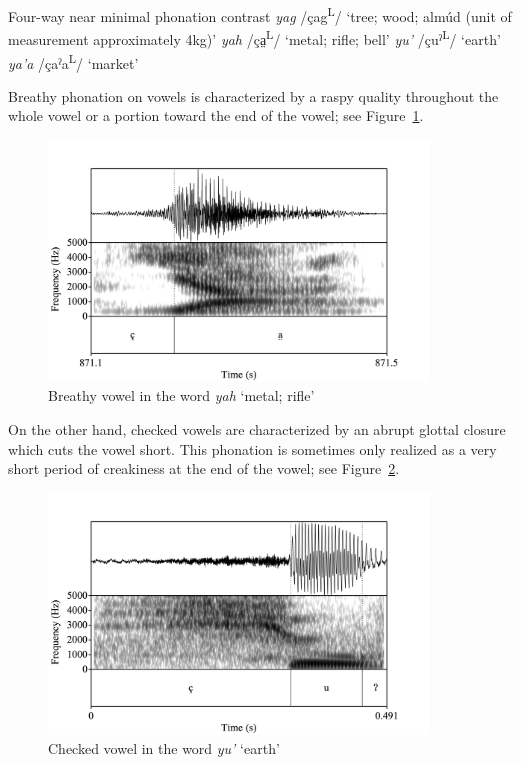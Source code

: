 \documentclass[12pt, letterpaper]{article}
\newcommand{\supr}[1]{\textsuperscript{#1}}
\begin{document}
\ea \label{ex:YA} Four-way near minimal phonation contrast
	\ea \textit{yag}  /çag\supr{L}/ `tree; wood; almúd (unit of measurement approximately 4kg)'
	\ex \textit{yah}  /ça̤\supr{L}/ `metal; rifle; bell'
	\ex \textit{yu'}  /çuˀ\supr{L}/  `earth'
	\ex \textit{ya'a}  /çaˀa\supr{L}/  `market'
	\z 
\z 

Breathy phonation on vowels is characterized by a raspy quality throughout the whole vowel or a portion toward the end of the vowel; see Figure~\ref{fig:BreathyVowel}. 

\begin{figure}[!h]
	\centering
	\includegraphics[width=0.9\textwidth]{Images/yah.png}
	\caption{Breathy vowel in the word \textit{yah} `metal; rifle'}
	\label{fig:BreathyVowel}
\end{figure}

On the other hand, checked vowels are characterized by an abrupt glottal closure which cuts the vowel short. This phonation is sometimes only realized as a very short period of creakiness at the end of the vowel; see Figure~\ref{fig:CheckedVowel}.  

\begin{figure}[!h]
	\centering
	\includegraphics[width=0.9\textwidth]{Images/RD_yu'.png}
	\caption{Checked vowel in the word \textit{yu'} `earth'}
	\label{fig:CheckedVowel}
\end{figure}
\end{document}
